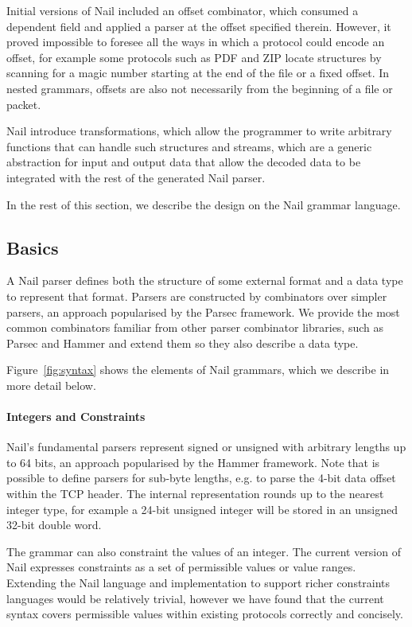Initial versions of Nail included an offset combinator, which consumed a dependent field and applied
a parser at the offset specified therein. However, it proved impossible to foresee all the ways in which a protocol could encode an offset, for example
some protocols such as PDF and ZIP locate structures by scanning for a magic number starting at the
end of the file or a fixed offset. In nested grammars, offsets are also not necessarily from
the beginning of a file or packet.

Nail introduce transformations, which allow the programmer to write arbitrary functions that can
handle such structures and streams, which are a generic abstraction for input and output data that
allow the decoded data to be integrated with the rest of the generated Nail parser.

In the rest of this section, we describe the design on the Nail grammar language.

\subsection{Basics}
A Nail parser defines both the structure of some external format and a data type to represent that
format. Parsers are constructed by combinators over simpler parsers, an approach popularised by the Parsec
framework\cite{LeijenMeijer:parsec}. We provide the most common combinators familiar from other parser
 combinator libraries, such as Parsec and Hammer\cite{hammer-parser} and extend them so they also
 describe a data type. 

Figure~\ref{fig:syntax} shows the elements of Nail grammars, which we describe in more detail below.
\paragraph{Integers and Constraints}

Nail's fundamental parsers represent signed or unsigned with arbitrary lengths up to 64 bits, an
approach popularised by the Hammer framework.\cite{hammer-parser}  
Note that is possible to define parsers for sub-byte lengths, e.g. to parse the 4-bit
data offset within the TCP header.  The internal representation rounds up to the nearest integer
type, for example a 24-bit unsigned integer will be stored in an unsigned 32-bit double word.

The grammar can also constraint the values of an integer. The current version of Nail expresses
constraints as a set of permissible values or value ranges. Extending the Nail language and
implementation to support richer constraints languages would be relatively trivial, however we have
found that the current syntax covers permissible values within existing protocols correctly and
concisely.

